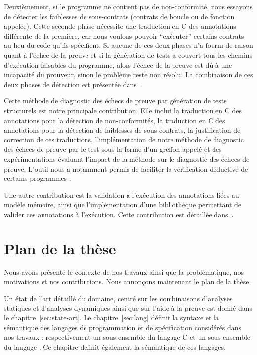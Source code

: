 Deuxièmement, si le programme ne contient pas de non-conformité, nous essayons
de détecter les faiblesses de sous-contrats (contrats de boucle ou de fonction
appelée).
Cette seconde phase nécessite une traduction en C des annotations \acsl
différente de la première, car nous voulons pouvoir ``exécuter'' certains
contrats au lieu du code qu'ils spécifient.
Si aucune de ces deux phases n'a fourni de raison quant à l'échec de la preuve
et si la génération de tests a couvert tous les chemins d'exécution faisables
du programme, alors l'échec de la preuve est dû à une incapacité du prouveur,
sinon le problème reste non résolu.
La combinaison de ces deux phases de détection est présentée
dans~\cite{Petiot/unpublished15}.

Cette méthode de diagnostic des échecs de preuve par génération de tests
structurels est notre principale contribution.
Elle inclut la traduction en C des annotations \acsl pour la détection de
non-conformités, la traduction en C des annotations \acsl pour la détection de
faiblesses de sous-contrats, la justification de correction de ces traductions,
l'implémentation de notre méthode de diagnostic des échecs de preuve par le test
sous la forme d'un greffon \framac appelé \stady et des expérimentations
évaluant l'impact de la méthode sur le diagnostic des échecs de preuve.
L'outil nous a notamment permis de faciliter la vérification déductive de
certains programmes \cite{Genestier/TAP15}.

Une autre contribution est la validation à l'exécution des annotations \acsl
liées au modèle mémoire, ainsi que l'implémentation d'une bibliothèque
permettant de valider ces annotations à l'exécution.
Cette contribution est détaillée dans~\cite{Kosmatov/RV13}. 


\section{Plan de la thèse}
\label{sec:plan}


Nous avons présenté le contexte de nos travaux ainsi que la problématique, nos
motivations et nos contributions.
Nous annonçons maintenant le plan de la thèse.

Un état de l'art détaillé du domaine, centré sur les combinaisons d'analyses
statiques et d'analyses dynamiques ainsi que sur l'aide à la preuve est
donné dans le chapitre~\ref{sec:state-art}.
Le chapitre~\ref{sec:lang} définit la syntaxe et la sémantique des langages de
programmation et de spécification considérés dans nos travaux : respectivement
un sous-ensemble du langage C et un sous-ensemble du langage \acsl.
Ce chapitre définit également la sémantique de ces langages.

